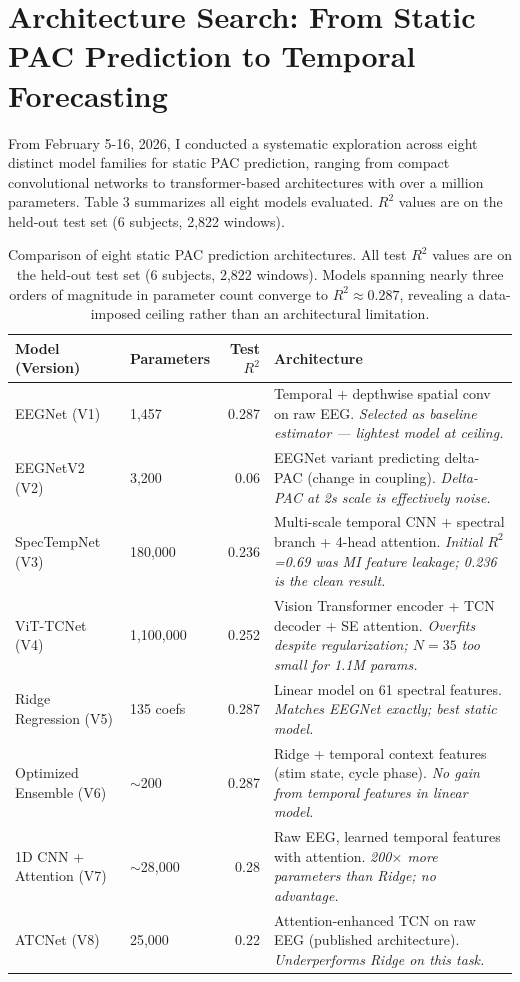 \documentclass[11pt,letterpaper]{article}
\begin{document}
\section{Architecture Search: From Static PAC Prediction to Temporal Forecasting}

From February 5-16, 2026, I conducted a systematic exploration across eight distinct model families for static PAC prediction, ranging from compact convolutional networks to transformer-based architectures with over a million parameters. Table 3 summarizes all eight models evaluated. $R^2$ values are on the held-out test set (6 subjects, 2,822 windows).

\begin{table}[htbp]
\centering
\caption{Comparison of eight static PAC prediction architectures. All test $R^2$ values are on the held-out test set (6 subjects, 2,822 windows). Models spanning nearly three orders of magnitude in parameter count converge to $R^2 \approx 0.287$, revealing a data-imposed ceiling rather than an architectural limitation.}
\label{tab:comparison_of_eight_static_pac_predictio}
\small
\begin{tabularx}{\textwidth}{@{}l l r X@{}}
\toprule
\textbf{Model (Version)} & \textbf{Parameters} & \textbf{Test $R^2$} & \textbf{Architecture} \\
\midrule
EEGNet (V1) & 1,457 & 0.287 & Temporal + depthwise spatial conv on raw EEG. \textit{Selected as baseline estimator --- lightest model at ceiling.} \\[4pt]
EEGNetV2 (V2) & 3,200 & 0.06 & EEGNet variant predicting delta-PAC (change in coupling). \textit{Delta-PAC at 2s scale is effectively noise.} \\[4pt]
SpecTempNet (V3) & 180,000 & 0.236 & Multi-scale temporal CNN + spectral branch + 4-head attention. \textit{Initial $R^2$=0.69 was MI feature leakage; 0.236 is the clean result.} \\[4pt]
ViT-TCNet (V4) & 1,100,000 & 0.252 & Vision Transformer encoder + TCN decoder + SE attention. \textit{Overfits despite regularization; $N = 35$ too small for 1.1M params.} \\[4pt]
Ridge Regression (V5) & 135 coefs & 0.287 & Linear model on 61 spectral features. \textit{Matches EEGNet exactly; best static model.} \\[4pt]
Optimized Ensemble (V6) & $\sim$200 & 0.287 & Ridge + temporal context features (stim state, cycle phase). \textit{No gain from temporal features in linear model.} \\[4pt]
1D CNN + Attention (V7) & $\sim$28,000 & 0.28 & Raw EEG, learned temporal features with attention. \textit{200$\times$ more parameters than Ridge; no advantage.} \\[4pt]
ATCNet (V8) & 25,000 & 0.22 & Attention-enhanced TCN on raw EEG (published architecture). \textit{Underperforms Ridge on this task.} \\
\bottomrule
\end{tabularx}
\end{table}
\end{document}
